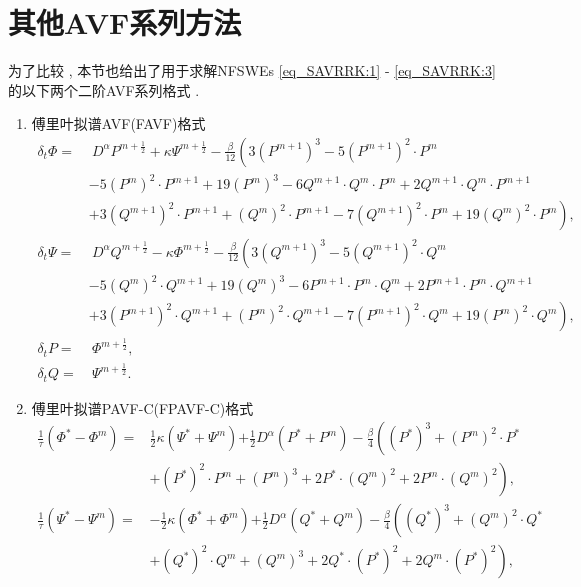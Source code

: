 \section{其他AVF系列方法}\label{Section_PAVF: 3-1}
为了比较 , 本节也给出了用于求解NFSWEs \eqref{eq_SAVRRK:1} - \eqref{eq_SAVRRK:3} 的以下两个二阶AVF系列格式 . 
\begin{enumerate}[$\bullet$]
\item 傅里叶拟谱AVF(FAVF)格式
\begin{align}
\delta_{t} \varPhi =&~{D^{\alpha} P^{m+\frac{1}{2}}}+\kappa \Psi^{m+\frac{1}{2}}-\frac{\beta}{12}\left(3 (P^{m+1})^3-5 (P^{m+1})^2\cdot P^{m}\right . \nonumber\\
		&-5 (P^{m})^2\cdot P^{m+1}+19 (P^{m})^3-6 Q^{m+1}\cdot Q^{m}\cdot P^{m}+2 Q^{m+1}\cdot Q^{m}\cdot P^{m+1} \nonumber\\
		&+\left . 3 (Q^{m+1})^2\cdot P^{m+1}+(Q^{m})^2\cdot P^{m+1}-7 (Q^{m+1})^2\cdot P^{m}+19 (Q^{m} )^2\cdot P^{m}\right) , \label{eq_PAVF:66}\\
\delta_{t} \Psi =&~{D^{\alpha} Q^{m+\frac{1}{2}}}-\kappa \varPhi^{m+\frac{1}{2}}-\frac{\beta}{12}\left(3 (Q^{m+1})^3-5 (Q^{m+1})^2\cdot Q^{m}\right . \nonumber\\
		&-5 (Q^{m})^2\cdot Q^{m+1}+19 (Q^{m})^3-6 P^{m+1}\cdot P^{m}\cdot Q^{m}+2 P^{m+1}\cdot P^{m}\cdot Q^{m+1} \nonumber\\
		&+\left . 3 (P^{m+1})^2\cdot Q^{m+1}+(P^{m})^2\cdot Q^{m+1}-7 (P^{m+1})^2\cdot Q^{m}+19 (P^{m} )^2\cdot Q^{m}\right) , \label{eq_PAVF:67}\\
\delta_{t} P=&~\varPhi^{m+\frac{1}{2}} , \label{eq_PAVF:68}\\
\delta_{t} Q=&~\Psi^{m+\frac{1}{2}} . \label{eq_PAVF:69}
\end{align}
\item 傅里叶拟谱PAVF-C(FPAVF-C)格式
\begin{align}
\frac{1}{\tau}\left(\varPhi^{*}-\varPhi^{m}\right)=&\frac{1}{2}\kappa(\Psi^{*}+\Psi^{m}){+\frac{1}{2}D^{\alpha} (P^{*}+P^{m})}-\frac{\beta}{4}\left( (P^{*})^3+ (P^{m})^{2}\cdot P^{*}\right . \nonumber\\
		&\left . + (P^{*})^{2}\cdot P^{m}+ (P^{m})^{3}+2 P^{*}\cdot (Q^{m})^{2}+2 P^{m}\cdot (Q^{m})^{2}\right) , \label{eq_PAVF:90}\\
\frac{1}{\tau}\left(\Psi^{*}-\Psi^{m}\right)=&-\frac{1}{2}\kappa (\varPhi^{*}+\varPhi^{m}){+\frac{1}{2}D^{\alpha} (Q^{*}+Q^{m})}-\frac{\beta}{4}\left( (Q^{*})^3+ (Q^{m})^{2}\cdot Q^{*}\right . \nonumber\\
		&\left . + (Q^{*})^{2}\cdot Q^{m}+ (Q^{m})^{3}+2 Q^{*}\cdot (P^{*})^{2}+2 Q^{m}\cdot (P^{*})^{2}\right) , \label{eq_PAVF:91}\\

\end{align}
\end{enumerate}
